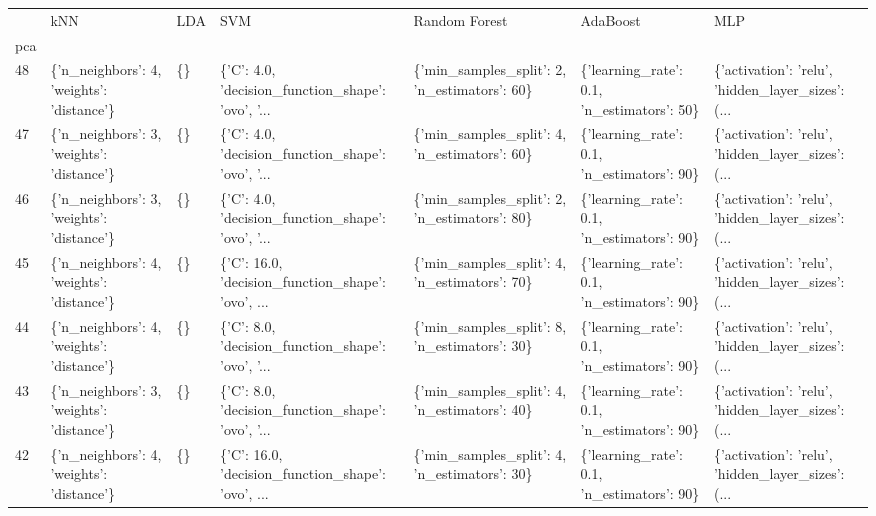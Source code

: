\begin{tabular}{lllllll}
\toprule
{} &                                        kNN & LDA &                                                SVM &                                 Random Forest &                                    AdaBoost &                                                MLP \\
pca &                                            &     &                                                    &                                               &                                             &                                                    \\
\midrule
48  &  \{'n\_neighbors': 4, 'weights': 'distance'\} &  \{\} &  \{'C': 4.0, 'decision\_function\_shape': 'ovo', '... &  \{'min\_samples\_split': 2, 'n\_estimators': 60\} &  \{'learning\_rate': 0.1, 'n\_estimators': 50\} &  \{'activation': 'relu', 'hidden\_layer\_sizes': (... \\
47  &  \{'n\_neighbors': 3, 'weights': 'distance'\} &  \{\} &  \{'C': 4.0, 'decision\_function\_shape': 'ovo', '... &  \{'min\_samples\_split': 4, 'n\_estimators': 60\} &  \{'learning\_rate': 0.1, 'n\_estimators': 90\} &  \{'activation': 'relu', 'hidden\_layer\_sizes': (... \\
46  &  \{'n\_neighbors': 3, 'weights': 'distance'\} &  \{\} &  \{'C': 4.0, 'decision\_function\_shape': 'ovo', '... &  \{'min\_samples\_split': 2, 'n\_estimators': 80\} &  \{'learning\_rate': 0.1, 'n\_estimators': 90\} &  \{'activation': 'relu', 'hidden\_layer\_sizes': (... \\
45  &  \{'n\_neighbors': 4, 'weights': 'distance'\} &  \{\} &  \{'C': 16.0, 'decision\_function\_shape': 'ovo', ... &  \{'min\_samples\_split': 4, 'n\_estimators': 70\} &  \{'learning\_rate': 0.1, 'n\_estimators': 90\} &  \{'activation': 'relu', 'hidden\_layer\_sizes': (... \\
44  &  \{'n\_neighbors': 4, 'weights': 'distance'\} &  \{\} &  \{'C': 8.0, 'decision\_function\_shape': 'ovo', '... &  \{'min\_samples\_split': 8, 'n\_estimators': 30\} &  \{'learning\_rate': 0.1, 'n\_estimators': 90\} &  \{'activation': 'relu', 'hidden\_layer\_sizes': (... \\
43  &  \{'n\_neighbors': 3, 'weights': 'distance'\} &  \{\} &  \{'C': 8.0, 'decision\_function\_shape': 'ovo', '... &  \{'min\_samples\_split': 4, 'n\_estimators': 40\} &  \{'learning\_rate': 0.1, 'n\_estimators': 90\} &  \{'activation': 'relu', 'hidden\_layer\_sizes': (... \\
42  &  \{'n\_neighbors': 4, 'weights': 'distance'\} &  \{\} &  \{'C': 16.0, 'decision\_function\_shape': 'ovo', ... &  \{'min\_samples\_split': 4, 'n\_estimators': 30\} &  \{'learning\_rate': 0.1, 'n\_estimators': 90\} &  \{'activation': 'relu', 'hidden\_layer\_sizes': (... \\

\end{tabular}
